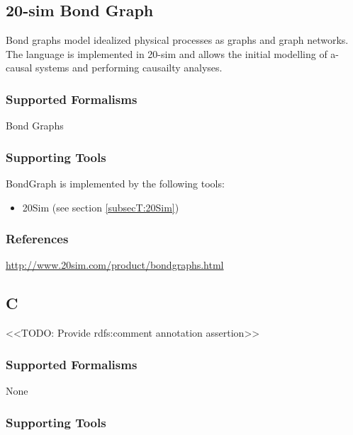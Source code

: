 \subsection{20-sim Bond Graph}
\label{subsecL:BondGraph}



Bond graphs model idealized physical processes as graphs and graph networks.
The language is implemented in 20-sim and allows the initial modelling of a-causal systems and performing causailty analyses.

\subsubsection{Supported Formalisms}

Bond Graphs


\subsubsection{Supporting Tools}

BondGraph is implemented by the following tools:
\begin{itemize}
	\item 20Sim (see section \ref{subsecT:20Sim})
\end{itemize}


\subsubsection{References}

\url{http://www.20sim.com/product/bondgraphs.html}



\subsection{C}
\label{subsecL:C}

<<TODO: Provide rdfs:comment annotation assertion>>

\subsubsection{Supported Formalisms}

None


\subsubsection{Supporting Tools}

